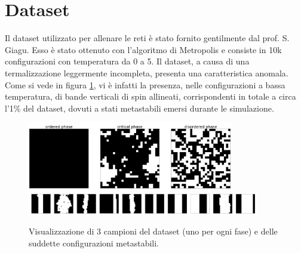 \documentclass[Lau, noexaminfo, oneside]{sapthesis} %
\begin{document}
\section{Dataset}
Il dataset utilizzato per allenare le reti è stato fornito gentilmente dal prof. S. Giagu. Esso è stato ottenuto con l'algoritmo di Metropolis e consiste in 10k configurazioni con temperatura da 0 a 5. Il dataset, a causa di una termalizzazione leggermente incompleta, presenta una caratteristica anomala. Come si vede in figura \ref{difetti}, vi è infatti la presenza, nelle configurazioni a bassa temperatura, di bande verticali di spin allineati, corrispondenti in totale a circa l'1\% del dataset, dovuti a stati metastabili emersi durante le simulazione.
\begin{figure}[H]
\includegraphics[width=0.8\textwidth]{dataset.pdf}\\
\includegraphics[width=0.9\textwidth]{difetti.pdf}
\centering
\caption{Visualizzazione di 3 campioni del dataset (uno per ogni fase) e delle suddette configurazioni metastabili.}
\label{difetti}
\end{figure}
\end{document}
